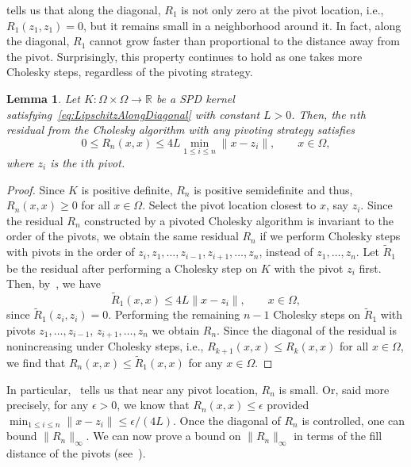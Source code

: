\documentclass{amsart}
\newtheorem{lemma}[theorem]{Lemma}
\theoremstyle{definition}
\theoremstyle{remark}
\begin{document}
 tells us that along the diagonal, $R_1$ is not only zero at the pivot location, i.e., $R_1(z_1,z_1) = 0$, but it remains small in a neighborhood around it. In fact, along the diagonal, $R_1$ cannot grow faster than proportional to the distance away from the pivot. Surprisingly, this property continues to hold as one takes more Cholesky steps, regardless of the pivoting strategy. 
\begin{lemma}\label{lem:MultiStepLipschitzControl}
Let $K:\Omega\times \Omega\to\mathbb{R}$ be a SPD kernel satisfying~\cref{eq:LipschitzAlongDiagonal} with constant $L>0$. Then, the $n$th residual from the Cholesky algorithm with any pivoting strategy satisfies
\begin{equation*}
   0\leq R_n(x, x) \leq 4L \min_{1\leq i\leq n} \|x - z_i\|, \qquad x\in\Omega,
\end{equation*} 
where $z_i$ is the $i$th pivot.
\end{lemma} 
\begin{proof} 
Since $K$ is positive definite, $R_n$ is positive semidefinite and thus, $R_n(x,x)\geq 0$ for all $x\in\Omega$. 
Select the pivot location closest to $x$, say $z_i$. Since the residual $R_n$ constructed by a pivoted Cholesky algorithm is invariant to the order of the pivots, we obtain the same residual $R_n$ if we perform Cholesky steps with pivots in the order of $z_i, z_1, \dots, z_{i-1}, z_{i+1}, \dots, z_n$, instead of $z_1, \dots, z_n$. Let $\tilde{R}_1$ be the residual after performing a Cholesky step on $K$ with the pivot $z_i$ first. Then, by~, we have
    \begin{equation*}
 \tilde{R}_1(x, x) \leq 4L \|x-z_i\|,\qquad x\in\Omega,
    \end{equation*}
    since $\tilde{R}_1(z_i, z_i) = 0$. Performing the remaining $n-1$ Cholesky steps on $\tilde{R}_1$ with pivots $z_1, \dots, z_{i-1}$, $z_{i+1}, \dots, z_n$ we obtain $R_n$. Since the diagonal of the residual is nonincreasing under Cholesky steps, i.e., $R_{k+1}(x,x)\leq R_{k}(x,x)$ for all $x\in\Omega$, we find that $R_n(x, x)\leq \tilde{R}_1(x, x)$ for any $x\in\Omega$.
\end{proof} 

In particular,~ tells us that near any pivot location, $R_n$ is small. Or, said more precisely, for any $\epsilon>0$, we know that $R_n(x,x)\leq \epsilon$ provided $\min_{1\leq i\leq n} \|x - z_i\|\leq \epsilon/(4L)$. Once the diagonal of $R_n$ is controlled, one can bound $\|R_n\|_\infty$. We can now prove a bound on $\|R_n\|_\infty$ in terms of the fill distance of the pivots (see~). 
\end{document}

